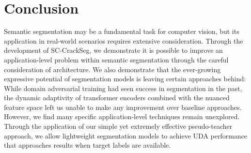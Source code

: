 \documentclass[a4paper,12pt]{report}
\begin{document}
\chapter{Conclusion}
Semantic segmentation may be a fundamental task for computer vision, but its application in real-world scenarios requires extensive consideration. Through the development of SC-CrackSeg, we demonstrate it is possible to improve an application-level problem within semantic segmentation through the careful consideration of architecture. We also demonstrate that the ever-growing expressive potential of segmentation models is leaving certain approaches behind: While domain adversarial training had seen success in segmentation in the past, the dynamic adaptivity of transformer encoders combined with the nuanced feature space left us unable to make any improvement over baseline approaches. However, we find many specific application-level techniques remain unexplored. Through the application of our simple yet extremely effective pseudo-teacher approach, we allow lightweight segmentation models to achieve UDA performance that approaches results when target labels are available.


{}

\end{document}
